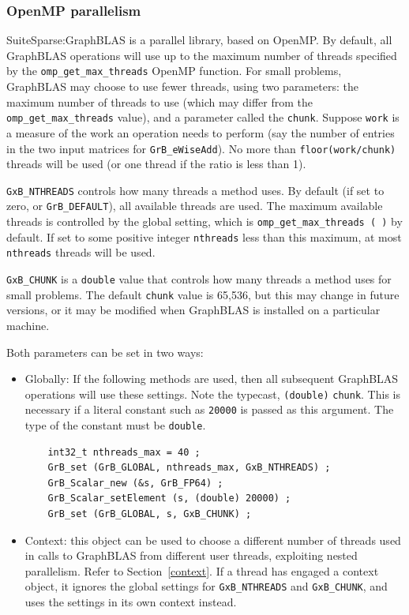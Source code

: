 \subsubsection{OpenMP parallelism}
\label{omp_parallelism}

SuiteSparse:GraphBLAS is a parallel library, based on OpenMP.  By
default, all GraphBLAS operations will use up to the maximum number of threads
specified by the \verb'omp_get_max_threads' OpenMP function.  For small
problems, GraphBLAS may choose to use fewer threads, using two parameters: the
maximum number of threads to use (which may differ from the
\verb'omp_get_max_threads' value), and a parameter called the \verb'chunk'.
Suppose \verb'work' is a measure of the work an operation needs to perform (say
the number of entries in the two input matrices for \verb'GrB_eWiseAdd').  No
more than \verb'floor(work/chunk)' threads will be used (or one thread if the
ratio is less than 1).

\verb'GxB_NTHREADS' controls how many threads a method uses.
    By default (if set to zero, or \verb'GrB_DEFAULT'), all available threads
    are used.  The maximum available threads is controlled by the global
    setting, which is \verb'omp_get_max_threads ( )' by default.  If set to
    some positive integer \verb'nthreads' less than this maximum, at most
    \verb'nthreads' threads will be used.

\verb'GxB_CHUNK' is a \verb'double' value that controls how many threads
    a method uses for small problems.
The default \verb'chunk' value is 65,536, but this may change in future
versions, or it may be modified when GraphBLAS is installed on a particular
machine.

Both parameters can be set in two ways:

\begin{itemize}

\item Globally:  If the following methods are used, then all subsequent
GraphBLAS operations will use these settings.  Note the typecast,
\verb'(double)' \verb'chunk'.  This is necessary if a literal constant such as
\verb'20000' is passed as this argument.  The type of the constant must be
\verb'double'.

    {\footnotesize
    \begin{verbatim}
    int32_t nthreads_max = 40 ;
    GrB_set (GrB_GLOBAL, nthreads_max, GxB_NTHREADS) ;
    GrB_Scalar_new (&s, GrB_FP64) ;
    GrB_Scalar_setElement (s, (double) 20000) ;
    GrB_set (GrB_GLOBAL, s, GxB_CHUNK) ; \end{verbatim} }

\item Context: this object can be used to choose a different number of
threads used in calls to GraphBLAS from different user threads, exploiting
nested parallelism.  Refer to Section~\ref{context}.  If a thread has engaged a
context object, it ignores the global settings for \verb'GxB_NTHREADS' and
\verb'GxB_CHUNK', and uses the settings in its own context instead.

\end{itemize}

